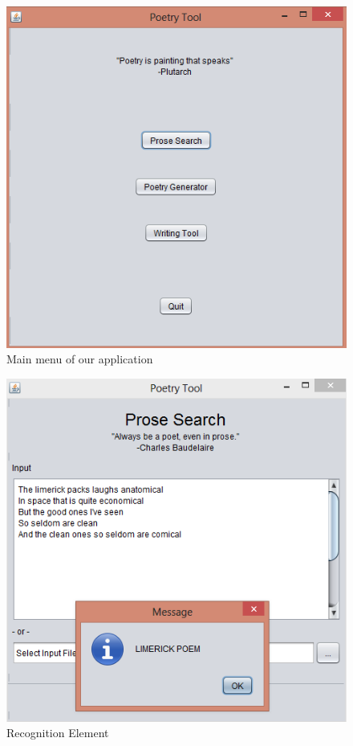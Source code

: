 \documentclass[10pt, letter]{article}
\begin{document}
\begin{figure}[ht]
  \centering
    \includegraphics[scale=0.5]{Images/screen1}
    \caption{Main menu of our application}
  \label{screen1}
\end{figure}

\begin{figure}[ht]
  \centering
    \includegraphics[scale=0.5]{Images/screen2}
    \caption{Recognition Element}
  \label{screen2}
\end{figure}
\end{document}
